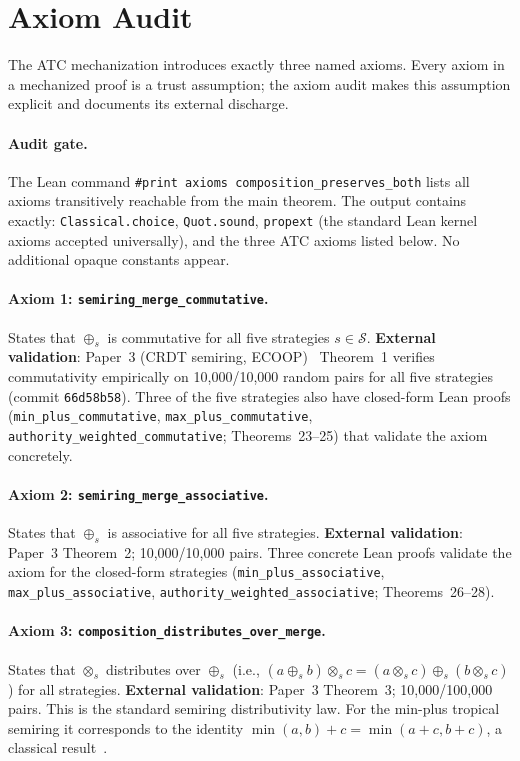 \documentclass[sigconf]{acmart}
\newcommand{\mergeadd}{\mathbin{\oplus}}
\newcommand{\mergemul}{\mathbin{\otimes}}
\newcommand{\ATC}{\textsc{ATC}}
\begin{document}
\section{Axiom Audit}
\label{sec:axioms}

The \ATC{} mechanization introduces exactly three named axioms.  Every axiom
in a mechanized proof is a trust assumption; the axiom audit makes this
assumption explicit and documents its external discharge.

\paragraph{Audit gate.}
The Lean command \texttt{\#print axioms composition\_preserves\_both} lists
all axioms transitively reachable from the main theorem.  The output contains
exactly: \texttt{Classical.choice}, \texttt{Quot.sound},
\texttt{propext} (the standard Lean kernel axioms accepted universally), and
the three \ATC{} axioms listed below.  No additional opaque constants appear.

\paragraph{Axiom 1: \texttt{semiring\_merge\_commutative}.}
States that $\mergeadd_s$ is commutative for all five strategies $s \in
\mathcal{S}$.  \textbf{External validation}: Paper~3 (CRDT semiring,
ECOOP)~\cite{paper-3-crdt-ecoop2027} Theorem~1 verifies commutativity
empirically on 10,000/10,000 random pairs for all five strategies (commit
\texttt{66d58b58}).  Three of the five strategies also have closed-form
Lean proofs (\texttt{min\_plus\_commutative}, \texttt{max\_plus\_commutative},
\texttt{authority\_weighted\_commutative}; Theorems~23--25) that validate the
axiom concretely.

\paragraph{Axiom 2: \texttt{semiring\_merge\_associative}.}
States that $\mergeadd_s$ is associative for all five strategies.
\textbf{External validation}: Paper~3 Theorem~2; 10,000/10,000 pairs.
Three concrete Lean proofs validate the axiom for the
closed-form strategies (\texttt{min\_plus\_associative},
\texttt{max\_plus\_associative},
\texttt{authority\_weighted\_associative}; Theorems~26--28).

\paragraph{Axiom 3: \texttt{composition\_distributes\_over\_merge}.}
States that $\mergemul_s$ distributes over $\mergeadd_s$ (i.e.,
$(a \mergeadd_s b) \mergemul_s c = (a \mergemul_s c) \mergeadd_s (b \mergemul_s c)$)
for all strategies.
\textbf{External validation}: Paper~3 Theorem~3; 10,000/100,000 pairs.
This is the standard semiring distributivity law.  For the min-plus tropical
semiring it corresponds to the identity $\min(a,b)+c = \min(a+c,b+c)$, a
classical result~\cite{mohri2002semiring}.
\end{document}
